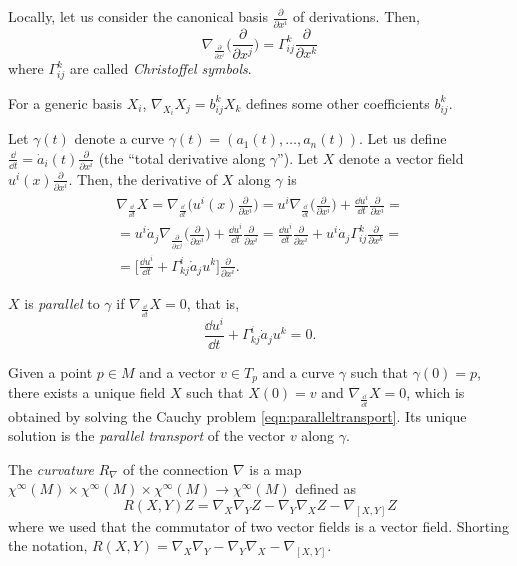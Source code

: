 \documentclass[a4paper,12pt]{book}
\begin{document}
\begin{definition}
Locally, let us consider the canonical basis $\frac{\partial}{\partial x^i}$ of derivations. Then,
\[\nabla_{\frac{\partial}{\partial x^i}}\biggl(\frac{\partial}{\partial x^j}\biggr)=\Gamma_{ij}^k\frac{\partial}{\partial x^k}\]
where $\Gamma_{ij}^k$ are called \emph{Christoffel symbols}.
\end{definition}

For a generic basis $X_i$, $\nabla_{X_i}X_j=b_{ij}^kX_k$ defines some other coefficients $b_{ij}^k$.

Let $\gamma(t)$ denote a curve $\gamma(t)=(a_1(t),\ldots,a_n(t))$. Let us define $\frac{\dd}{\dd t}=\dot a_i(t)\frac{\partial}{\partial x^i}$ (the ``total derivative along $\gamma$''). Let $X$ denote a vector field $u^i(x)\frac{\partial}{\partial x^i}$. Then, the derivative of $X$ along $\gamma$ is
\begin{multline*}\nabla_{\frac{\dd}{\dd t}}X=\nabla_{\frac{\dd}{\dd t}}\biggl(u^i(x)\frac{\partial}{\partial x^i}\biggr)=u^i\nabla_{\frac{\dd}{\dd t}}\biggl(\frac{\partial}{\partial x^i}\biggr)+\frac{\dd u^i}{\dd t}\frac{\partial}{\partial x^i}=\\
=u^i\dot a_j\nabla_{\frac{\partial}{\partial x^j}}\biggl(\frac{\partial}{\partial x^i}\biggr)+\frac{\dd u^i}{\dd t}\frac{\partial}{\partial x^i}=\frac{\dd u^i}{\dd t}\frac{\partial}{\partial x^i}+u^i\dot a_j\Gamma_{ij}^k\frac{\partial}{\partial x^k}=\\
=\biggl[\frac{\dd u^i}{\dd t}+\Gamma_{kj}^i\dot a_ju^k\biggr]\frac{\partial}{\partial x^i}.\end{multline*}

\begin{definition}
$X$ is \emph{parallel} to $\gamma$ if $\nabla_{\frac{\dd}{\dd t}}X=0$, that is,
\begin{equation}
\label{eqn:paralleltransport}
\frac{\dd u^i}{\dd t}+\Gamma_{kj}^i\dot a_ju^k=0.
\end{equation}
\end{definition}

Given a point $p\in M$ and a vector $v\in T_p$ and a curve $\gamma$ such that $\gamma(0)=p$, there exists a unique field $X$ such that $X(0)=v$ and $\nabla_{\frac{\dd}{\dd t}}X=0$, which is obtained by solving the Cauchy problem \cref{eqn:paralleltransport}. Its unique solution is the \emph{parallel transport} of the vector $v$ along $\gamma$.

\begin{definition}
The \emph{curvature} $R_\nabla$ of the connection $\nabla$ is a map $\chi^\infty(M)\times\chi^\infty(M)\times\chi^\infty(M)\to\chi^\infty(M)$ defined as
\[R(X,Y)Z=\nabla_X\nabla_YZ-\nabla_Y\nabla_XZ-\nabla_{[X,Y]}Z\]
where we used that the commutator of two vector fields is a vector field. Shorting the notation, $R(X,Y)=\nabla_X\nabla_Y-\nabla_Y\nabla_X-\nabla_{[X,Y]}$.
\end{definition}
\end{document}
